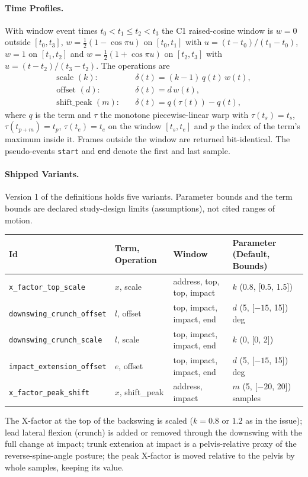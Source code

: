 \paragraph{Time Profiles.}
With window event times $t_0 < t_1 \le t_2 < t_3$ the C1 raised-cosine window is
$w=0$ outside $[t_0,t_3]$, $w = \tfrac12(1-\cos\pi u)$ on $[t_0,t_1]$ with
$u=(t-t_0)/(t_1-t_0)$, $w=1$ on $[t_1,t_2]$ and
$w = \tfrac12(1+\cos\pi u)$ on $[t_2,t_3]$ with $u=(t-t_2)/(t_3-t_2)$. The
operations are
\begin{align}
  \text{scale } (k):&\quad \delta(t) = (k-1)\,q(t)\,w(t), \\
  \text{offset } (d):&\quad \delta(t) = d\,w(t), \\
  \text{shift\_peak } (m):&\quad \delta(t) = q(\tau(t)) - q(t),
\end{align}
where $q$ is the term and $\tau$ the monotone piecewise-linear warp with
$\tau(t_s)=t_s$, $\tau(t_{p+m}) = t_p$, $\tau(t_e)=t_e$ on the window
$[t_s,t_e]$ and $p$ the index of the term's maximum inside it. Frames outside
the window are returned bit-identical. The pseudo-events \texttt{start} and
\texttt{end} denote the first and last sample.

\paragraph{Shipped Variants.}
Version 1 of the definitions holds five variants. Parameter bounds and the
term bounds are declared study-design limits (assumptions), not cited ranges of
motion.
\begin{center}
\begin{tabular}{llll}
\hline
Id & Term, Operation & Window & Parameter (Default, Bounds) \\
\hline
\texttt{x\_factor\_top\_scale} & $x$, scale & address, top, top, impact & $k$ (0.8, [0.5, 1.5]) \\
\texttt{downswing\_crunch\_offset} & $l$, offset & top, impact, impact, end & $d$ (5, [$-15$, 15]) deg \\
\texttt{downswing\_crunch\_scale} & $l$, scale & top, impact, impact, end & $k$ (0, [0, 2]) \\
\texttt{impact\_extension\_offset} & $e$, offset & top, impact, impact, end & $d$ (5, [$-15$, 15]) deg \\
\texttt{x\_factor\_peak\_shift} & $x$, shift\_peak & address, impact & $m$ (5, [$-20$, 20]) samples \\
\hline
\end{tabular}
\end{center}
The X-factor at the top of the backswing is scaled ($k=0.8$ or $1.2$ as in the
issue); lead lateral flexion (crunch) is added or removed through the
downswing with the full change at impact; trunk extension at impact is a
pelvis-relative proxy of the reverse-spine-angle posture; the peak X-factor is
moved relative to the pelvis by whole samples, keeping its value.


